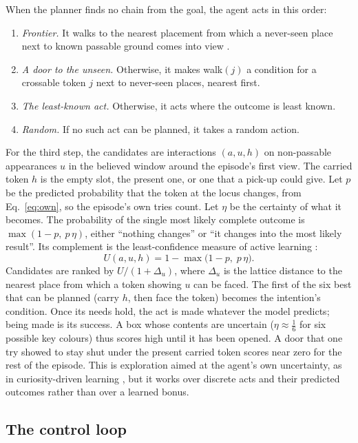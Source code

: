 \documentclass{article}
\newcommand{\cond}[1]{\textsf{#1}}
\begin{document}
When the planner finds no chain from the goal, the agent acts in this order:
\begin{enumerate}
    \item \emph{Frontier.} It walks to the nearest placement from which a never-seen place next to known passable ground comes into view \cite{Yamauchi1997}.
    \item \emph{A door to the unseen.} Otherwise, it makes \cond{walk}$(j)$ a condition for a crossable token $j$ next to never-seen places, nearest first.
    \item \emph{The least-known act.} Otherwise, it acts where the outcome is least known.
    \item \emph{Random.} If no such act can be planned, it takes a random action.
\end{enumerate}
For the third step, the candidates are interactions $(a,u,h)$ on non-passable appearances $u$ in the believed window around the episode's first view. The carried token $h$ is the empty slot, the present one, or one that a pick-up could give. Let $p$ be the predicted probability that the token at the locus changes, from Eq.~\eqref{eq:own}, so the episode's own tries count. Let $\eta$ be the certainty of what it becomes. The probability of the single most likely complete outcome is $\max(1-p,\ p\,\eta)$, either ``nothing changes'' or ``it changes into the most likely result''. Its complement is the least-confidence measure of active learning \cite{Settles2009}:
\begin{equation} \label{eq:uncertainty}
    U(a,u,h) = 1 - \max\big(1-p,\; p\,\eta\big).
\end{equation}
Candidates are ranked by $U/(1+\Delta_u)$, where $\Delta_u$ is the lattice distance to the nearest place from which a token showing $u$ can be faced. The first of the six best that can be planned (carry $h$, then face the token) becomes the intention's condition. Once its needs hold, the act is made whatever the model predicts; being made is its success. A box whose contents are uncertain ($\eta\approx\tfrac16$ for six possible key colours) thus scores high until it has been opened. A door that one try showed to stay shut under the present carried token scores near zero for the rest of the episode. This is exploration aimed at the agent's own uncertainty, as in curiosity-driven learning \cite{Schmidhuber1991,Pathak2017}, but it works over discrete acts and their predicted outcomes rather than over a learned bonus.

\subsection{The control loop}
\end{document}
